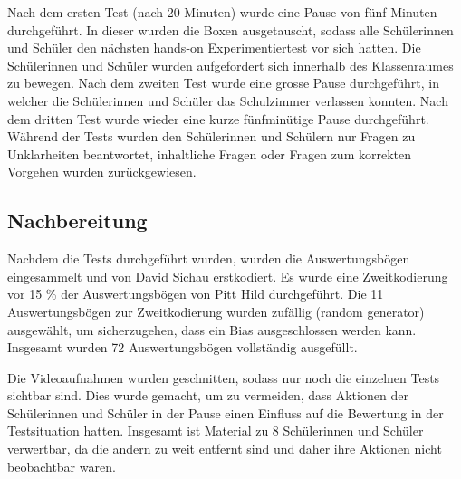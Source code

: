 Nach dem ersten Test (nach 20 Minuten) wurde eine Pause von fünf Minuten durchgeführt. In dieser wurden die Boxen ausgetauscht, sodass alle Schülerinnen und Schüler den nächsten hands-on Experimentiertest vor sich hatten. Die Schülerinnen und Schüler wurden aufgefordert sich innerhalb des Klassenraumes zu bewegen. Nach dem zweiten Test wurde eine grosse Pause durchgeführt, in welcher die Schülerinnen und Schüler das Schulzimmer verlassen konnten. Nach dem dritten Test wurde wieder eine kurze fünfminütige Pause durchgeführt. Während der Tests wurden den Schülerinnen und Schülern nur Fragen zu Unklarheiten beantwortet, inhaltliche Fragen oder Fragen zum korrekten Vorgehen wurden zurückgewiesen. 

\subsection{Nachbereitung}

Nachdem die Tests durchgeführt wurden, wurden die Auswertungsbögen eingesammelt und von David Sichau erstkodiert. Es wurde eine Zweitkodierung vor 15 \% der Auswertungsbögen von Pitt Hild durchgeführt. Die 11 Auswertungsbögen zur Zweitkodierung wurden zufällig (random generator) ausgewählt, um sicherzugehen, dass ein Bias ausgeschlossen werden kann. Insgesamt wurden 72 Auswertungsbögen vollständig ausgefüllt. 

Die Videoaufnahmen wurden geschnitten, sodass nur noch die einzelnen Tests sichtbar sind. Dies wurde gemacht, um zu vermeiden, dass Aktionen der Schülerinnen und Schüler in der Pause einen Einfluss auf die Bewertung in der Testsituation hatten. Insgesamt ist Material zu 8 Schülerinnen und Schüler verwertbar, da die andern zu weit entfernt sind und daher ihre Aktionen nicht beobachtbar waren.

